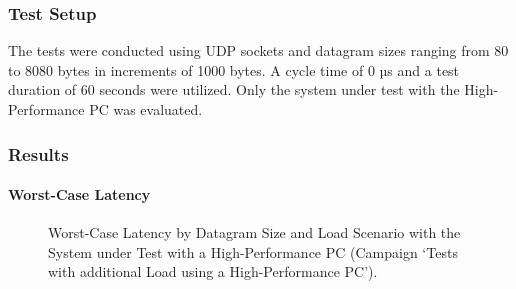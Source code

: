 \subsubsection{Test Setup}
The tests were conducted using UDP sockets and datagram sizes ranging from 80 to 8080 bytes in increments of 1000 bytes. A cycle time of 0 µs and a test duration of 60 seconds were utilized. Only the system under test with the High-Performance PC was evaluated.

\subsubsection{Results}
\paragraph{Worst-Case Latency}

\begin{figure}[h!]
  \centering
  \caption{Worst-Case Latency by Datagram Size and Load Scenario with the System under Test with a High-Performance PC (Campaign `Tests with additional Load using a High-Performance PC').}
  \label{fig:StressWc}
\end{figure}

